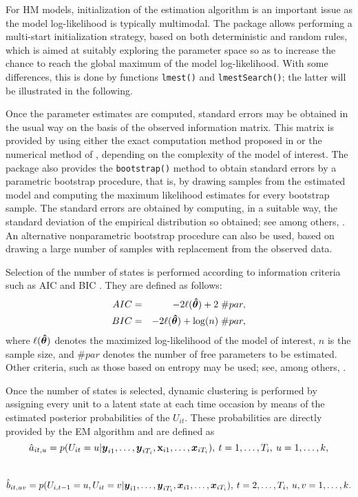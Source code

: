 For HM models, initialization of the estimation algorithm is an
important issue as the model log-likelihood is typically multimodal. The
 package allows performing a multi-start initialization
strategy, based on both deterministic and random rules, which is aimed
at suitably exploring the parameter space so as to increase the chance
to reach the global maximum of the model log-likelihood. With some
differences, this is done by functions \texttt{lmest()} and \texttt{lmestSearch()};
the latter will be illustrated in the following.

Once the parameter estimates are computed, standard errors may be
obtained in the usual way on the basis of the observed information
matrix. This matrix is provided by  using either the
exact computation method proposed in \cite{bart:farc:15a} or the
numerical method of \cite{bart:farc:09}, depending on the complexity of
the model of interest. The package also provides the \texttt{bootstrap()}
method to obtain standard errors by a parametric bootstrap procedure,
that is, by drawing samples from the estimated model and computing the
maximum likelihood estimates for every bootstrap sample. The standard
errors are obtained by computing, in a suitable way, the standard
deviation of the empirical distribution so obtained; see among others,
\cite{viss:spee:22}. An alternative nonparametric bootstrap procedure
can also be used, based on drawing a large number of samples with
replacement from the observed data.

Selection of the number of states is performed according to information
criteria such as AIC \citep{aka:73} and BIC \citep{sch:78}. They are
defined as follows:
\begin{eqnarray*}
AIC &=& -2 {\ell}(\mbox{\boldmath $\hat{\theta}$}) + 2 \;\#par,\\
BIC &=& -2 {\ell}(\mbox{\boldmath $\hat{\theta}$}) + \log(n)\;\#par,
\end{eqnarray*}
where \({\ell}(\mbox{\boldmath $\hat{\theta}$})\) denotes the maximized log-likelihood
of the model of interest, \(n\) is the sample size, and \(\#par\) denotes
the number of free parameters to be estimated. Other criteria, such as
those based on entropy may be used; see, among others,
\cite{bacc:pand:penn:14}.

Once the number of states is selected, dynamic clustering is performed
by assigning every unit to a latent state at each time occasion by means
of the estimated posterior probabilities of the \(U_{it}\). These
probabilities are directly provided by the EM algorithm and are defined
as \begin{equation}
\hat{a}_{it,u} = p(U_{it}=u | \mbox{\boldmath $y$}_{i1},\ldots, \mbox{\boldmath $y$}_{iT_i},\mathbf{x}_{i1},\ldots,\mbox{\boldmath $x$}_{iT_i}), \: t=1,\ldots,T_i, \: u = 1,\ldots,k, \label{eq:postprob}
\end{equation}\\
\[
\hat{b}_{it,uv} = p(U_{i,t-1}=u, U_{it}=v | \mbox{\boldmath $y$}_{i1},\ldots,\mbox{\boldmath $y$}_{iT_i},\mbox{\boldmath $x$}_{i1},\ldots,\mbox{\boldmath $x$}_{iT_i}), \: t=2,\ldots,T_i, \: u,v = 1,\ldots,k. \label{eq:postprob2}
\]

